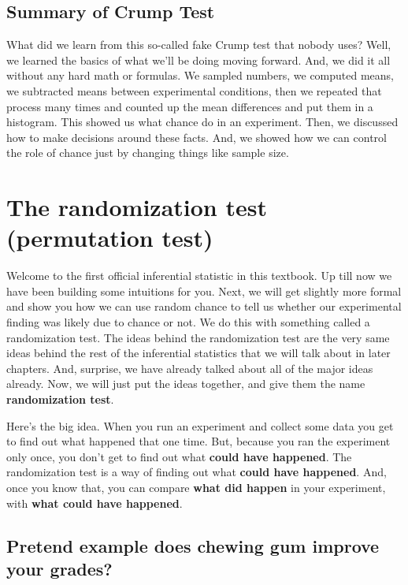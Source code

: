 \documentclass[
  letterpaper,
  DIV=11,
  numbers=noendperiod]{scrreprt}
\begin{document}
\subsection{Summary of Crump Test}\label{summary-of-crump-test}

What did we learn from this so-called fake Crump test that nobody uses?
Well, we learned the basics of what we'll be doing moving forward. And,
we did it all without any hard math or formulas. We sampled numbers, we
computed means, we subtracted means between experimental conditions,
then we repeated that process many times and counted up the mean
differences and put them in a histogram. This showed us what chance do
in an experiment. Then, we discussed how to make decisions around these
facts. And, we showed how we can control the role of chance just by
changing things like sample size.

\section{The randomization test (permutation
test)}\label{the-randomization-test-permutation-test}

Welcome to the first official inferential statistic in this textbook. Up
till now we have been building some intuitions for you. Next, we will
get slightly more formal and show you how we can use random chance to
tell us whether our experimental finding was likely due to chance or
not. We do this with something called a randomization test. The ideas
behind the randomization test are the very same ideas behind the rest of
the inferential statistics that we will talk about in later chapters.
And, surprise, we have already talked about all of the major ideas
already. Now, we will just put the ideas together, and give them the
name \textbf{randomization test}.

Here's the big idea. When you run an experiment and collect some data
you get to find out what happened that one time. But, because you ran
the experiment only once, you don't get to find out what \textbf{could
have happened}. The randomization test is a way of finding out what
\textbf{could have happened}. And, once you know that, you can compare
\textbf{what did happen} in your experiment, with \textbf{what could
have happened}.

\subsection{Pretend example does chewing gum improve your
grades?}\label{pretend-example-does-chewing-gum-improve-your-grades}
\end{document}
